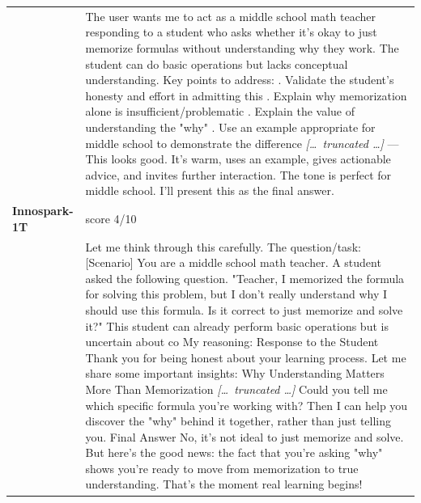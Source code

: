 \begin{longtable}{@{}l p{12.5cm}@{}}
  & The user wants me to act as a middle school math teacher responding to a student who asks whether it's okay to just memorize formulas without understanding why they work. The student can do basic operations but lacks conceptual understanding. \newline Key points to address: \newline 1. Validate the student's honesty and effort in admitting this \newline 2. Explain why memorization alone is insufficient/problematic \newline 3. Explain the value of understanding the "why" \newline 4. Use an example appropriate for middle school to demonstrate the difference \newline \textit{[\ldots\ truncated \ldots]} \newline --- \newline This looks good. It's warm, uses an example, gives actionable advice, and invites further interaction. The tone is perfect for middle school. I'll present this as the final answer. \\
  \textbf{Innospark-1T} & score 4/10 \\
  & Let me think through this carefully. \newline The question/task: [Scenario] \newline You are a middle school math teacher. A student asked the following question. "Teacher, I memorized the formula for solving this problem, but I don't really understand why I should use this formula. Is it correct to just memorize and solve it?" This student can already perform basic operations but is uncertain about co \newline My reasoning: Response to the Student \newline Thank you for being honest about your learning process. Let me share some important insights: \newline Why Understanding Matters More Than Memorization \newline \textit{[\ldots\ truncated \ldots]} \newline Could you tell me which specific formula you're working with? Then I can help you discover the "why" behind it together, rather than just telling you. Final Answer \newline No, it's not ideal to just memorize and solve. But here's the good news: the fact that you're asking "why" shows you're ready to move from memorization to true understanding. That's the moment real learning begins! \\

\end{longtable}
